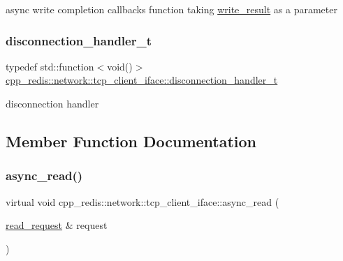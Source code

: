 async write completion callbacks function taking \hyperlink{structcpp__redis_1_1network_1_1tcp__client__iface_1_1write__result}{write\+\_\+result} as a parameter \mbox{\label{classcpp__redis_1_1network_1_1tcp__client__iface_a9a7d5942205db8be03da581a848b8ec0}} 
\subsubsection{\texorpdfstring{disconnection\+\_\+handler\+\_\+t}{disconnection\_handler\_t}}
{\footnotesize\ttfamily typedef std\+::function$<$void()$>$ \hyperlink{classcpp__redis_1_1network_1_1tcp__client__iface_a9a7d5942205db8be03da581a848b8ec0}{cpp\+\_\+redis\+::network\+::tcp\+\_\+client\+\_\+iface\+::disconnection\+\_\+handler\+\_\+t}}

disconnection handler 

\subsection{Member Function Documentation}
\mbox{\label{classcpp__redis_1_1network_1_1tcp__client__iface_ae1f9fa87002273a0caf340407bb68ade}} 
\subsubsection{\texorpdfstring{async\+\_\+read()}{async\_read()}}
{\footnotesize\ttfamily virtual void cpp\+\_\+redis\+::network\+::tcp\+\_\+client\+\_\+iface\+::async\+\_\+read (\begin{DoxyParamCaption}\item[{\hyperlink{structcpp__redis_1_1network_1_1tcp__client__iface_1_1read__request}{read\+\_\+request} \&}]{request }\end{DoxyParamCaption})\hspace{0.3cm}{\ttfamily [pure virtual]}}


